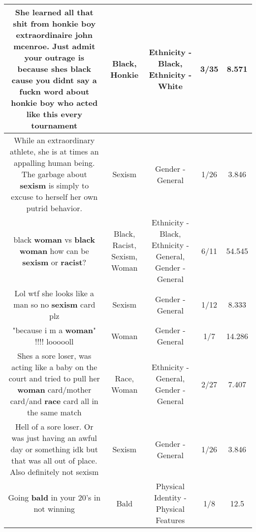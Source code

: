 \documentclass[11pt]{article}
\newlength\mylength
\begin{document}
\begin{center}
\begin{longtable}{|C{.65\mylength}|C{.30\mylength}|C{.12\mylength}|C{.12\mylength}|C{.12\mylength}|}
  \small She learned all that shit from \textbf{honkie} boy extraordinaire john mcenroe. Just admit your outrage is because shes \textbf{black} cause you didnt say a fuckn word about \textbf{honkie} boy who acted like this every tournament\normalsize   & Black, Honkie & Ethnicity - Black, Ethnicity - White & 3/35 & 8.571 \\  \hline
  \small While an extraordinary athlete, she is at times an appalling human being.  The garbage about \textbf{sexism} is simply to excuse to herself her own putrid behavior.\normalsize   & Sexism & Gender - General & 1/26 & 3.846 \\  \hline
  \small black \textbf{woman} vs \textbf{black} \textbf{woman} how can be \textbf{sexism} or \textbf{racist}?\normalsize   & Black, Racist, Sexism, Woman & Ethnicity - Black, Ethnicity - General, Gender - General & 6/11 & 54.545 \\  \hline
  \small Lol wtf she looks like a man so no \textbf{sexism} card plz\normalsize   & Sexism & Gender - General & 1/12 & 8.333 \\  \hline
  \small "because i m a \textbf{woman}" !!!! loooooll\normalsize   & Woman & Gender - General & 1/7 & 14.286 \\  \hline
  \small Shes a sore loser, was acting like a baby on the court and tried to pull her \textbf{woman} card/mother card/and \textbf{race} card all in the same match\normalsize   & Race, Woman & Ethnicity - General, Gender - General & 2/27 & 7.407 \\  \hline
  \small Hell of a sore loser. Or was just having an awful day or something idk but that was all out of place. Also definitely not sexism\normalsize   & Sexism & Gender - General & 1/26 & 3.846 \\  \hline
  \small Going \textbf{bald} in your 20's in not winning\normalsize   & Bald & Physical Identity - Physical Features & 1/8 & 12.5 \\  \hline

\end{longtable}
\end{center}
\end{document}
